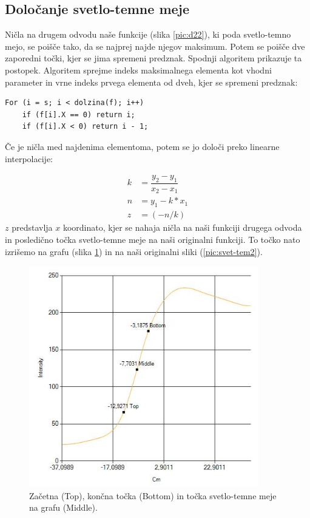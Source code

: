 \documentclass[oneside, a4paper, 12pt]{book}
\begin{document}
\subsection{Določanje svetlo-temne meje}

Ničla na drugem odvodu naše funkcije (slika \ref{pic:d22}), ki poda svetlo-temno mejo, se poišče tako, da se najprej najde njegov maksimum. Potem se poišče dve zaporedni točki, kjer se jima spremeni predznak. Spodnji algoritem prikazuje ta postopek. Algoritem sprejme indeks maksimalnega elementa kot vhodni parameter in vrne indeks prvega elementa od dveh, kjer se spremeni predznak:
\begin{samepage}
\begin{verbatim}
For (i = s; i < dolzina(f); i++)
    if (f[i].X == 0) return i;
    if (f[i].X < 0) return i - 1;
\end{verbatim}
\end{samepage}

Če je ničla med najdenima elementoma, potem se jo določi preko linearne interpolacije:

\begin{align}
k &= \dfrac{y_2-y_1}{x_2-x_1}  \nonumber\\
n &= y_1-k*x_1 \\
z &= (-n/k) \nonumber
\end{align} 
$z$ predstavlja $x$ koordinato, kjer se nahaja ničla na naši funkciji drugega odvoda in posledično točka svetlo-temne meje na naši originalni funkciji. To točko nato izrišemo na grafu (slika \ref{pic:svet-tem}) in na naši originalni sliki (\ref{pic:svet-tem2}).

\begin{figure}
\begin{center}
\includegraphics[width=10cm]{slike/svetlo-temna-meja.jpg}
\end{center}
\caption{Začetna (Top), končna točka (Bottom) in točka svetlo-temne meje na grafu (Middle).}
\label{pic:svet-tem}
\end{figure}
\end{document}
